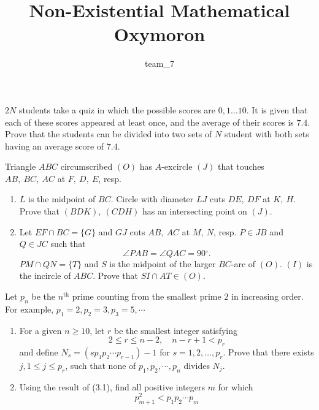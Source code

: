 \documentclass[a4paper]{article}
\title{\textbf{Non-Existential Mathematical Oxymoron}}
\author{team\_7}
\begin{document}
	
	\maketitle
	
	\begin{problem}
		$ 2N $ students take a quiz in which the possible scores are $ 0, 1\dots 10 $. It is given that each of these scores appeared at least once, and the average of their scores is $ 7.4 $. Prove that the students can be divided into two sets of $ N $ student with both sets having an average score of $ 7.4 $.
	\end{problem}

	\bigskip



	\begin{problem}
		Triangle $ABC$ circumscribed $(O)$ has $A$-excircle $(J)$ that touches $AB,\ BC,\ AC$ at $F,\ D,\ E$, resp.
		
		\begin{enumerate}
			\item $L$ is the midpoint of $BC$. Circle with diameter $LJ$ cuts $DE,\ DF$ at $K,\ H$. Prove that $(BDK),\ (CDH)$ has an intersecting point on $(J)$.
			\item Let $EF\cap BC =\{G\}$ and $GJ$ cuts $AB,\ AC$ at $M,\ N$, resp. $P\in JB$ and $Q\in JC$ such that
			$$\angle PAB=\angle QAC=90{}^\circ .$$$PM\cap QN=\{T\}$ and $S$ is the midpoint of the larger $BC$-arc of $(O)$. $(I)$ is the incircle of $ABC$. Prove that $SI\cap AT\in (O)$.
		\end{enumerate}
	\end{problem}
	
	\bigskip
	
	
	
	\begin{problem}
		Let $p_n$ be the $n^{\mbox{th}}$ prime counting from the smallest prime $2$ in increasing order. For example, $p_1=2, p_2=3, p_3 =5, \cdots$
		
		\begin{enumerate}
			\item For a given $n \ge 10$, let $r$ be the smallest integer satisfying
			\[2\le r \le n-2, \quad n-r+1 < p_r\]
			and define $N_s=(sp_1p_2\cdots p_{r-1})-1$ for $s=1,2,\ldots, p_r$. Prove that there exists $j, 1\le j \le p_r$, such that none of $p_1,p_2,\cdots, p_n$ divides $N_j$.
			
			\item Using the result of (3.1), find all positive integers $m$ for which
			\[p_{m+1}^2 < p_1p_2\cdots p_m\]
		\end{enumerate}
	\end{problem}
	
\end{document}
